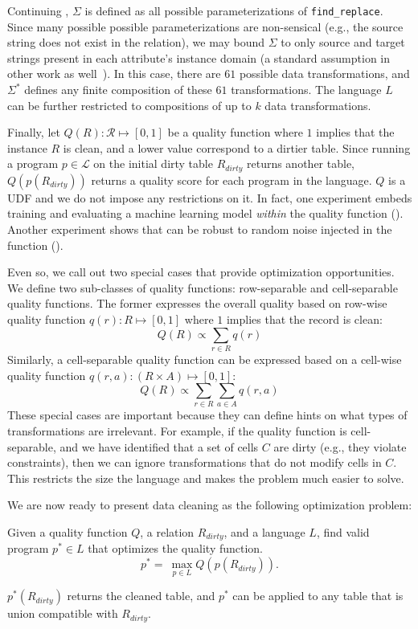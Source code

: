\begin{example}\label{ex2}
  Continuing , $\Sigma$ is defined as all possible parameterizations of \texttt{find\_replace}.  Since many possible possible parameterizations are non-sensical (e.g., the source string does not exist in the relation), we may bound $\Sigma$ to only source and target strings present in each attribute's instance domain (a standard assumption in other work as well~\cite{DBLP:series/synthesis/2012Fan}).  In this case, there are $61$ possible data transformations, and $\Sigma^*$ defines any finite composition of these $61$ transformations.  The language $L$ can be further restricted to compositions of up to $k$ data transformations.  
\end{example}

Finally, let $Q(R): \mathcal{R} \mapsto [0,1]$ be a quality function where $1$ implies that the instance $R$ is clean, and a lower value correspond to a dirtier table.
Since running a program $p\in\mathcal{L}$ on the initial dirty table $R_{dirty}$ returns another table, $Q(p(R_{dirty}))$ returns a quality score for each program in the language.  
$Q$ is a UDF and we do not impose any restrictions on it. In fact, one experiment embeds training and evaluating a machine learning model {\it within} the quality function ().  Another experiment shows that \sys can be robust to random noise injected in the function ().   

Even so, we call out two special cases that provide optimization opportunities. 
We define two sub-classes of quality functions: row-separable and cell-separable quality functions.
The former expresses the overall quality based on row-wise quality function $q(r): R \mapsto [0,1]$ where $1$ implies that the record is clean:
{\small\[Q(R) \propto \sum_{r \in R} q(r)\]}
\noindent Similarly, a cell-separable quality function can be expressed based on a cell-wise quality function $q(r, a): (R\times A) \mapsto [0,1]$:
{\small\[Q(R) \propto \sum_{r \in R} \sum_{a \in A} q(r,a)\]}
These special cases are important because they can define hints on what types of transformations are irrelevant.
For example, if the quality function is cell-separable, and we have identified that a set of cells $C$ are dirty (e.g., they violate constraints), then we can ignore transformations that do not modify cells in $C$.  This restricts the size the language and makes the problem much easier to solve.


\noindent We are now ready to present data cleaning as the following optimization problem:
\begin{problem}
Given a quality function $Q$, a relation $R_{dirty}$, and a language $L$, find valid program $p^* \in L$ that optimizes the quality function.
\[
p^* = ~ \max_{p \in L} Q( p(R_{dirty}) ).  
\]
\end{problem}
$p^*(R_{dirty})$ returns the cleaned table, and $p^*$ can be applied to any table that is union compatible with $R_{dirty}$.


